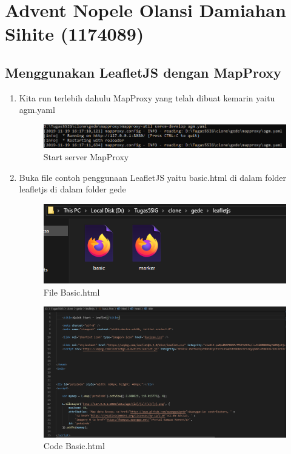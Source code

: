 \section{Advent Nopele Olansi Damiahan Sihite (1174089)}
\subsection{Menggunakan LeafletJS dengan MapProxy}
\begin{enumerate}
    \item Kita run terlebih dahulu MapProxy yang telah dibuat kemarin yaitu agm.yaml
    \hfill\break
    \begin{figure}[H]
		\includegraphics[width=12cm]{figures/Tugas5/1174089/1.png}
		\centering
		\caption{Start server MapProxy}
	\end{figure}
    \item Buka file contoh penggunaan LeafletJS yaitu basic.html di dalam folder leafletjs di dalam folder gede
    \hfill\break
    \begin{figure}[H]
		\includegraphics[width=12cm]{figures/Tugas5/1174089/2.png}
		\centering
		\caption{File Basic.html}
	\end{figure}
	\begin{figure}[H]
		\includegraphics[width=12cm]{figures/Tugas5/1174089/7.png}
		\centering
		\caption{Code Basic.html}

\end{figure}
\end{enumerate}
